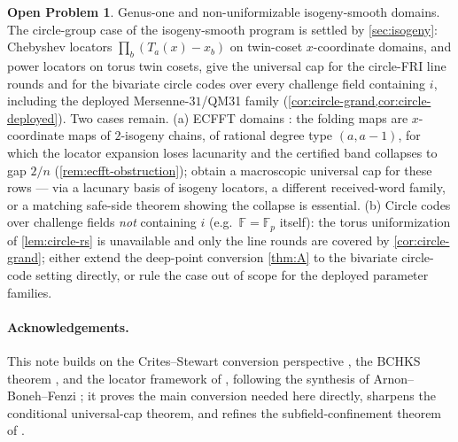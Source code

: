 \documentclass[11pt]{article}
\theoremstyle{definition}
\newtheorem{problem}[theorem]{Open Problem}
\theoremstyle{remark}
\newcommand{\F}{\mathbb{F}}
\begin{document}
\begin{problem}\label{prob:isogeny}
Genus-one and non-uniformizable isogeny-smooth domains. The circle-group case of the isogeny-smooth program is settled by \cref{sec:isogeny}: Chebyshev locators $\prod_b(T_a(x)-x_b)$ on twin-coset $x$-coordinate domains, and power locators on torus twin cosets, give the universal cap for the circle-FRI line rounds and for the bivariate circle codes over every challenge field containing $i$, including the deployed Mersenne-$31$/QM31 family (\cref{cor:circle-grand,cor:circle-deployed}). Two cases remain. \textup{(a)} ECFFT domains \cite{BCKL21}: the folding maps are $x$-coordinate maps of $2$-isogeny chains, of rational degree type $(a,a-1)$, for which the locator expansion loses lacunarity and the certified band collapses to gap $2/n$ (\cref{rem:ecfft-obstruction}); obtain a macroscopic universal cap for these rows --- via a lacunary basis of isogeny locators, a different received-word family, or a matching safe-side theorem showing the collapse is essential. \textup{(b)} Circle codes over challenge fields \emph{not} containing $i$ (e.g.\ $\F=\F_p$ itself): the torus uniformization of \cref{lem:circle-rs} is unavailable and only the line rounds are covered by \cref{cor:circle-grand}; either extend the deep-point conversion \cref{thm:A} to the bivariate circle-code setting directly, or rule the case out of scope for the deployed parameter families.
\end{problem}

\paragraph{Acknowledgements.} This note builds on the Crites--Stewart conversion perspective \cite{CS25}, the BCHKS theorem \cite{BCHKS25}, and the locator framework of \cite{Cho26a,Cho26b}, following the synthesis of Arnon--Boneh--Fenzi \cite{ABF26}; it proves the main conversion needed here directly, sharpens the conditional universal-cap theorem, and refines the subfield-confinement theorem of \cite{Cho26b}.
\end{document}
